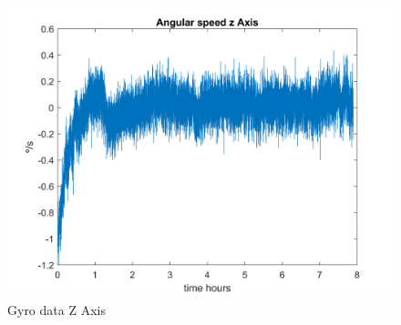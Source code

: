 \begin{itemize}
\begin{figure}[H]
\begin{minipage}{0.32\linewidth}
            \centering
            \includegraphics[width=0.95\linewidth]{res/img/Nadir_no_EKF/Gyro data Z Axis.png}
            \caption{Gyro data Z Axis}
            \label{fig:GyroDataZ}
        \end{minipage}
    \end{figure}


\end{itemize}

